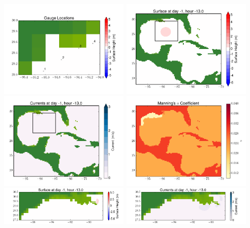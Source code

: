 \documentclass[11pt]{article}
\begin{document}
\includegraphics[width=0.475\textwidth]{frame0034fig10.png}
\vskip 10pt 
\includegraphics[width=0.475\textwidth]{frame0035fig1.png}
\includegraphics[width=0.475\textwidth]{frame0035fig2.png}
\vskip 10pt 
\includegraphics[width=0.475\textwidth]{frame0035fig3.png}
\includegraphics[width=0.475\textwidth]{frame0035fig4.png}
\vskip 10pt 
\includegraphics[width=0.475\textwidth]{frame0035fig5.png}
\end{document}
